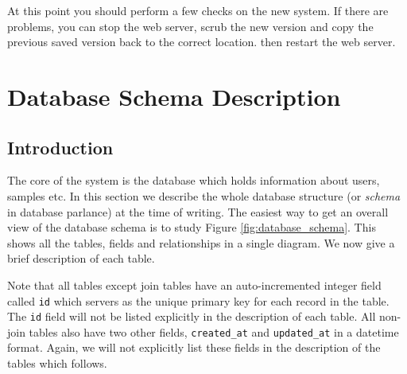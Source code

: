 \documentclass[12pt,twoside]{article}
\begin{document}
At this point you should perform a few checks on the new system. If there are
problems, you can stop the web server, scrub the new version and copy the 
previous saved version back to the correct location. then restart the web
server.


\section{Database Schema Description}\label{sec:database}
\subsection{Introduction}
The core of the system is the database which holds information about 
users, samples etc. In this section we describe the whole database
structure (or \emph{schema} in database parlance) at the time
of writing.
The easiest way to get an overall view of the database schema is to
study Figure \ref{fig:database_schema}. This shows
all the tables, fields and relationships in a single diagram.
We now give a brief description of each table.

Note that all tables except join tables have an auto-incremented integer field
called \verb=id= which servers as the unique primary key for each record
in the table. The \verb=id= field will not be listed explicitly in the
description of each table. All non-join tables also have two other
fields, \verb=created_at= and \verb=updated_at= in a datetime format.
Again, we will not explicitly list these fields in the description
of the tables which follows.
\end{document}
